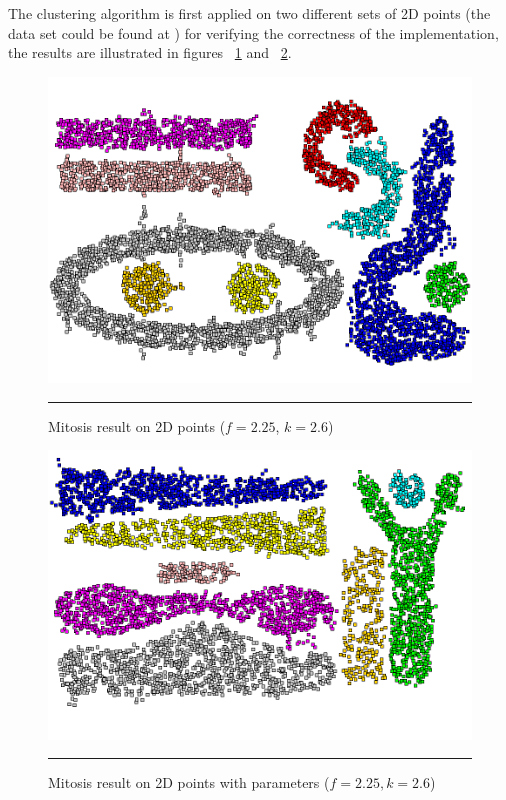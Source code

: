 The clustering algorithm is first applied on two different sets of 2D points (the data set could be found at \citep{Mitosis_2}) for verifying the correctness of the implementation, the results are illustrated in figures ~\ref{fig:mitosis_7} and ~\ref{fig:mitosis_8}.
\begin{figure}[htbp]
	\centering
		\includegraphics{./Figures/Mitosis_7.png}
		\rule{25em}{0.3pt}
	\caption[Mitosis result on 2D points ($f = 2.25$, $k = 2.6$)]{Mitosis result on 2D points ($f = 2.25$, $k = 2.6$)}
	\label{fig:mitosis_7}
\end{figure}

\begin{figure}[htbp]
	\centering
		\includegraphics{./Figures/Mitosis_8.png}
		\rule{25em}{0.3pt}
	\caption[Mitosis result on 2D points with parameters ($f = 2.15, k = 2.5$)]{Mitosis result on 2D points with parameters ($f = 2.25, k = 2.6$)}
	\label{fig:mitosis_8}
\end{figure}

